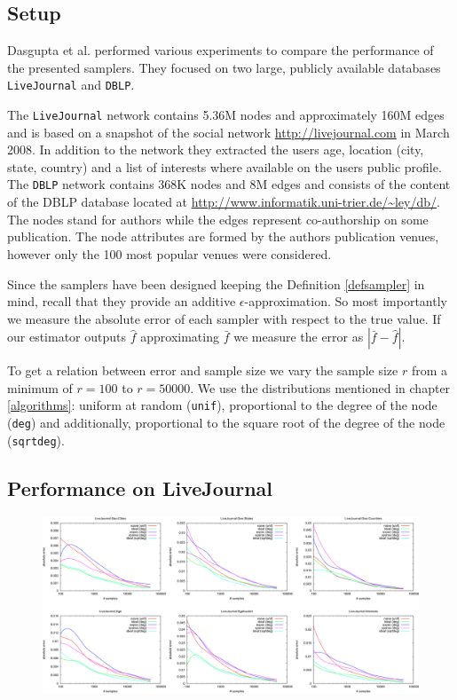 \subsection{Setup}
Dasgupta et al. \cite{dasgupta2012social} performed various experiments to compare the performance of the presented samplers.
They focused on two large, publicly available databases \texttt{LiveJournal} and \texttt{DBLP}.

The \texttt{LiveJournal} network contains 5.36M nodes and approximately 160M edges and is based on a snapshot of the social network \url{http://livejournal.com} in March 2008. In addition to the network they extracted the users age, location (city, state, country) and a list of interests where available on the users public profile.
The \texttt{DBLP} network contains 368K nodes and 8M edges and consists of the content of the DBLP database located at \url{http://www.informatik.uni-trier.de/~ley/db/}. The nodes stand for authors while the edges represent co-authorship on some publication. The node attributes are formed by the authors publication venues, however only the 100 most popular venues were considered. 

Since the samplers have been designed keeping the Definition \ref{defsampler} in mind, recall that they provide an additive $\epsilon$-approximation. So most importantly we measure the absolute error of each sampler with respect to the true value. If our estimator outputs $\hat{f}$ approximating $\bar{f}$ we measure the error as $|\bar{f}-\hat{f}|$.

To get a relation between error and sample size we vary the sample size $r$ from a minimum of $r = 100$ to $r = 50000$. We use the distributions mentioned in chapter \ref{algorithms}: uniform at random (\texttt{unif}), proportional to the degree of the node (\texttt{deg}) and additionally, proportional to the square root of the degree of the node (\texttt{sqrtdeg}). 
\subsection{Performance on LiveJournal}
\begin{figure}[!ht]
  \begin{center}
    \includegraphics[width=\linewidth]{fig2_3}
  \end{center}
\end{figure}
